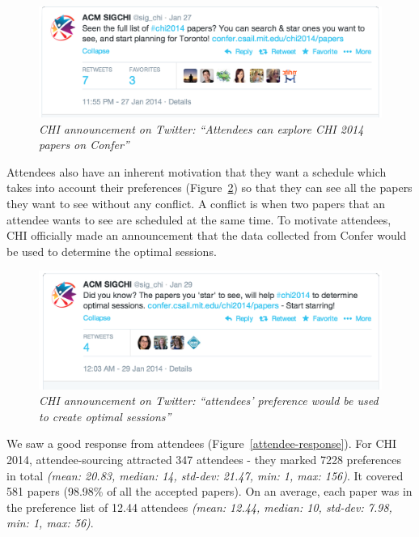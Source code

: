 \documentclass[letterpaper]{article}
\begin{document}
\begin{enumerate}[I]
\begin{figure}[!h]
\centering
\includegraphics[width=0.9\columnwidth]{chi-announcement-2.png}
\caption{\emph{CHI announcement on Twitter: ``Attendees can explore CHI 2014 papers on Confer''}}
\label{chi-announcement-2}
\end{figure}

Attendees also have an inherent motivation that they want a schedule which takes into account their preferences (Figure~\ref{chi-announcement-1}) so that they can see all the papers they want to see without any conflict. A conflict is when two papers that an attendee wants to see are scheduled at the same time. To motivate attendees, CHI officially made an announcement that the data collected from Confer would be used to determine the optimal sessions.
 

\begin{figure}[!h]
\centering
\includegraphics[width=0.9\columnwidth]{chi-announcement-1.png}
\caption{\emph{CHI announcement on Twitter: ``attendees' preference would be used to create optimal sessions''}}
\label{chi-announcement-1}
\end{figure}
\noindent

We saw a good response from attendees (Figure~\ref{attendee-response}). For CHI 2014, attendee-sourcing attracted 347 attendees - they marked 7228 preferences in total \emph{(mean: 20.83, median: 14, std-dev: 21.47, min: 1, max: 156)}. It covered 581 papers (98.98\% of all the accepted papers). On an average, each paper was in the preference list of 12.44 attendees \emph{(mean: 12.44, median: 10, std-dev: 7.98, min: 1, max: 56)}.



\end{enumerate}
\end{document}
